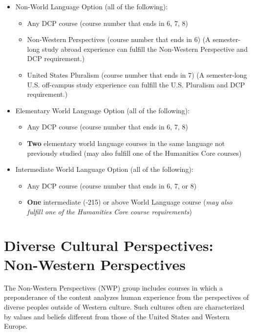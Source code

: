 \documentclass[
  letterpaper,
]{scrbook}
\providecommand{\tightlist}{%
  \setlength{\itemsep}{0pt}\setlength{\parskip}{0pt}}
\begin{document}
\begin{itemize}
\tightlist
\item
  Non-World Language Option (all of the following):

  \begin{itemize}
  \tightlist
  \item
    Any DCP course (course number that ends in 6, 7, 8)
  \item
    Non-Western Perspectives (course number that ends in 6) (A
    semester-long study abroad experience can fulfill the Non-Western
    Perspective and DCP requirement.)
  \item
    United States Pluralism (course number that ends in 7) (A
    semester-long U.S. off-campus study experience can fulfill the U.S.
    Pluralism and DCP requirement.)
  \end{itemize}
\item
  Elementary World Language Option (all of the following):

  \begin{itemize}
  \tightlist
  \item
    Any DCP course (course number that ends in 6, 7, 8)
  \item
    \textbf{Two} elementary world language courses in the same language
    not previously studied (may also fulfill one of the Humanities Core
    courses)
  \end{itemize}
\item
  Intermediate World Language Option (all of the following):

  \begin{itemize}
  \tightlist
  \item
    Any DCP course (course number that ends in 6, 7, or 8)
  \item
    \textbf{One} intermediate (-215) or above World Language course
    (\emph{may also fulfill one of the Humanities Core course
    requirements})
  \end{itemize}
\end{itemize}

\section{Diverse Cultural Perspectives: Non-Western
Perspectives}\label{sec-diverse-cultural-perspectives-non-western}

The Non-Western Perspectives (NWP) group includes courses in which a
preponderance of the content analyzes human experience from the
perspectives of diverse peoples outside of Western culture. Such
cultures often are characterized by values and beliefs different from
those of the United States and Western Europe.
\end{document}
